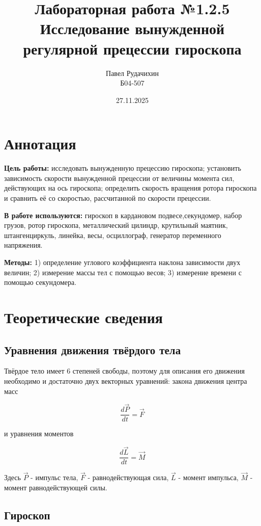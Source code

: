 \documentclass{article}
\title{Лабораторная работа №1.2.5 \\ Исследование вынужденной регулярной прецессии гироскопа}
\author{Павел Рудачихин \\ Б04-507}
\date{27.11.2025}
\begin{document}
\maketitle{}
\section* {Аннотация} 

\hspace{4mm} \textbf{Цель работы:} исследовать вынужденную прецессию гироскопа; установить зависимость скорости вынужденной прецессии от величины момента сил, действующих на ось гироскопа; определить скорость вращения ротора гироскопа и сравнить её со скоростью, рассчитанной по скорости прецессии.

\textbf{В работе используются:} гироскоп в кардановом подвесе,секундомер, набор грузов, ротор гироскопа, металлический цилиндр, крутильный маятник, штангенциркуль, линейка, весы, осциллограф, генератор переменного напряжения. 

\textbf{Методы:} 1) определение  углового  коэффициента  наклона  зависимости двух величин; 2) измерение массы тел с помощью весов; 3) измерение времени с помощью секундомера.

\section* {Теоретические сведения}
\subsection* {Уравнения движения твёрдого тела}

\hspace{4mm} Твёрдое тело имеет 6 степеней свободы, поэтому для описания его движения необходимо и достаточно двух векторных уравнений: закона движения центра масс

\begin{equation}
	\frac{d\vec{P}}{dt} = \vec{F}
\end{equation}

и уравнения моментов

\begin{equation}
	\frac{d\vec{L}}{dt} = \vec{M}
\end{equation}

Здесь $\vec{P}$ - импульс тела, $\vec{F}$ - равнодействующая сила, $\vec{L}$ - момент импульса, $\vec{M}$ - момент равнодействующей силы.

\subsection* {Гироскоп}
\end{document}
